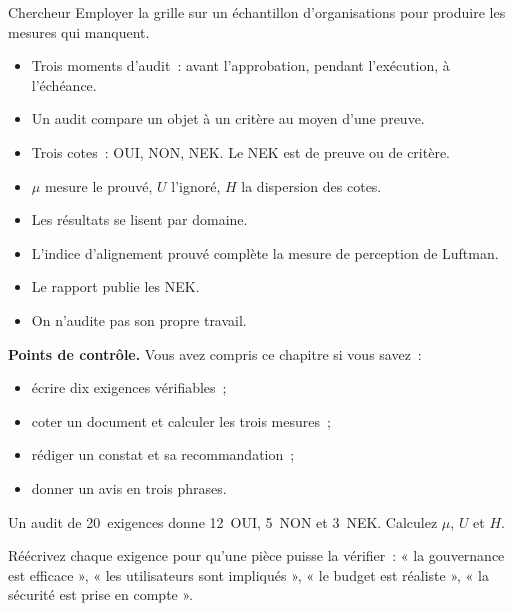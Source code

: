 \begin{boxmetier}{Chercheur}
Employer la grille sur un échantillon d'organisations pour produire les mesures qui manquent.
\end{boxmetier}

\begin{boxresume}
\begin{itemize}
    \item Trois moments d'audit~: avant l'approbation, pendant l'exécution, à l'échéance.
    \item Un audit compare un objet à un critère au moyen d'une preuve.
    \item Trois cotes~: OUI, NON, NEK. Le NEK est de preuve ou de critère.
    \item $\mu$ mesure le prouvé, $U$ l'ignoré, $H$ la dispersion des cotes.
    \item Les résultats se lisent par domaine.
    \item L'indice d'alignement prouvé complète la mesure de perception de Luftman.
    \item Le rapport publie les NEK.
    \item On n'audite pas son propre travail.
\end{itemize}
\end{boxresume}

\begin{boxinfo}
\textbf{Points de contrôle.} Vous avez compris ce chapitre si vous savez~:
\begin{itemize}
    \item écrire dix exigences vérifiables~;
    \item coter un document et calculer les trois mesures~;
    \item rédiger un constat et sa recommandation~;
    \item donner un avis en trois phrases.
\end{itemize}
\end{boxinfo}

\begin{boxexo}[title={\ding{45}\quad Exercice~16.1. Trois mesures \niveaubase}]
Un audit de 20~exigences donne 12~OUI, 5~NON et 3~NEK. Calculez $\mu$, $U$ et $H$.
\end{boxexo}

\begin{boxexo}[title={\ding{45}\quad Exercice~16.2. Réécrire \niveaumoyen}]
Réécrivez chaque exigence pour qu'une pièce puisse la vérifier~: « la gouvernance est efficace », « les utilisateurs sont impliqués », « le budget est réaliste », « la sécurité est prise en compte ».
\end{boxexo}

